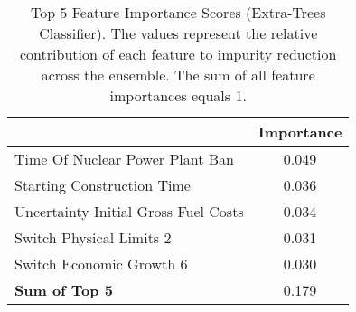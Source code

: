 \begin{table}
\centering
\renewcommand{\arraystretch}{1.5}
\caption{Top 5 Feature Importance Scores (Extra-Trees Classifier). The values represent the relative contribution of each feature to impurity reduction across the ensemble. The sum of all feature importances equals 1.}
\label{tab:top5_features}
\begin{tabular}{lc}
\toprule
 & \textbf{Importance} \\
\midrule
Time Of Nuclear Power Plant Ban & 0.049 \\
Starting Construction Time & 0.036 \\
Uncertainty Initial Gross Fuel Costs & 0.034 \\
Switch Physical Limits 2 & 0.031 \\
Switch Economic Growth 6 & 0.030 \\
\hline
\textbf{Sum of Top 5} & 0.179 \\
\bottomrule
\end{tabular}
\end{table}
